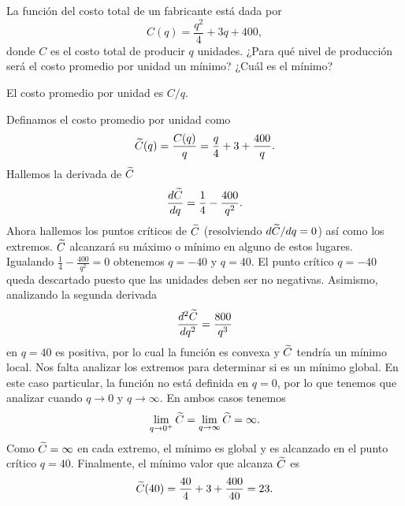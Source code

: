 \begin{statement}{5}
  La funci\'on del costo total de un fabricante est\'a dada por
  \[
    C(q) = \frac{q^2}{4} + 3q + 400,
  \]
  donde $C$ es el costo total de producir $q$ unidades.
  ¿Para qu\'e nivel de producci\'on ser\'a el costo promedio por unidad un m\'inimo?
  ¿Cu\'al es el m\'inimo?

  \begin{note}
    El costo promedio por unidad es $C / q$.
  \end{note}

\end{statement}

\begin{solution}
  Definamos el costo promedio por unidad como
  \[
    \widetilde{C}(q) = \frac{C(q)}{q} = \frac{q}{4} + 3 + \frac{400}{q}.
  \]
  Hallemos la derivada de $\widetilde{C}$
  \[
    \frac{d \widetilde{C}}{dq} = \frac{1}{4} - \frac{400}{q^2}.
  \]
  Ahora hallemos los puntos cr\'iticos de $\widetilde{C}$ (resolviendo $d \widetilde{C} / dq = 0$)
  as\'i como los extremos. $\widetilde{C}$ alcanzar\'a su m\'aximo o m\'inimo en alguno de estos lugares.
  Igualando $\frac{1}{4} - \frac{400}{q^2} = 0$ obtenemos $q = -40$ y $q = 40$.
  El punto cr\'itico $q = -40$ queda descartado puesto que las unidades deben ser no negativas.
  Asimismo, analizando la segunda derivada
  \[
    \frac{d^2 \widetilde{C}}{dq^2} = \frac{800}{q^3}
  \]
  en $q = 40$ es positiva, por lo cual la funci\'on es convexa y
  $\widetilde{C}$ tendr\'ia un m\'inimo local.
  Nos falta analizar los extremos para determinar si es un m\'inimo global.
  En este caso particular, la funci\'on no est\'a definida en $q = 0$, por lo que tenemos
  que analizar cuando $q \to 0$ y $q \to \infty$.
  En ambos casos tenemos
  \[
    \lim_{q \to 0^+} \widetilde{C} = \lim_{q \to \infty} \widetilde{C} = \infty.
  \]
  Como $\widetilde{C} = \infty$ en cada extremo, el m\'inimo es global y es alcanzado en el punto
  cr\'itico $q = 40$.
  Finalmente, el m\'inimo valor que alcanza $\widetilde{C}$ es
  \[
    \widetilde{C}(40) = \frac{40}{4} + 3 + \frac{400}{40} = 23.
  \]
\end{solution}